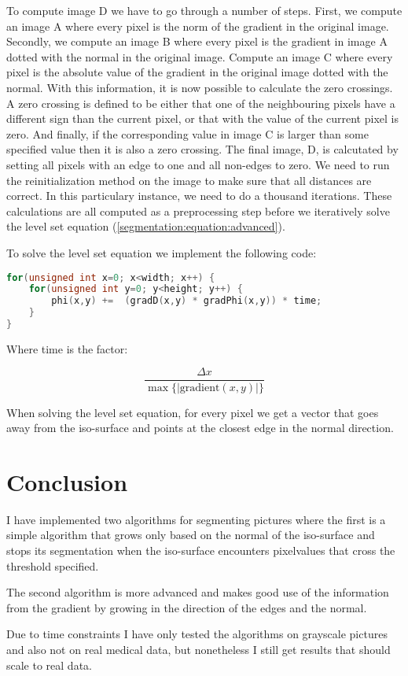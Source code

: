 To compute image D we have to go through a number of steps. First, we
compute an image A where every pixel is the norm of the gradient in
the original image. Secondly, we compute an image B where every pixel
is the gradient in image A dotted with the normal in the original
image. Compute an image C where every pixel is the absolute value of
the gradient in the original image dotted with the normal.  With this
information, it is now possible to calculate the zero crossings. A
zero crossing is defined to be either that one of the neighbouring
pixels have a different sign than the current pixel, or that with the
value of the current pixel is zero. And finally, if the corresponding
value in image C is larger than some specified value then it is also a
zero crossing. The final image, D, is calcutated by setting all pixels
with an edge to one and all non-edges to zero. We need to run the
reinitialization method on the image to make sure that all distances
are correct. In this particulary instance, we need to do a thousand
iterations. These calculations are all computed as a preprocessing
step before we iteratively solve the level set equation
(\vref*{segmentation:equation:advanced}).

To solve the level set equation we implement the following code:
\begin{lstlisting}[language=c++]
for(unsigned int x=0; x<width; x++) {
    for(unsigned int y=0; y<height; y++) {
        phi(x,y) +=  (gradD(x,y) * gradPhi(x,y)) * time;
    }
}
\end{lstlisting}

Where time is the factor:

\begin{equation*}
  \dfrac{\Delta x} {\max \{|\textrm{gradient}(x,y)|\}} 
\end{equation*}

When solving the level set equation, for every pixel we get a vector
that goes away from the iso-surface and points at the closest edge in
the normal direction.

\section{Conclusion}
\label{segmentation:conclusion}

I have implemented two algorithms for segmenting pictures where the
first is a simple algorithm that grows only based on the normal of the
iso-surface and stops its segmentation when the iso-surface encounters
pixelvalues that cross the threshold specified.

The second algorithm is more advanced and makes good use of the
information from the gradient by growing in the direction of the edges
and the normal.

Due to time constraints I have only tested the algorithms on grayscale
pictures and also not on real medical data, but nonetheless I still
get results that should scale to real data.


